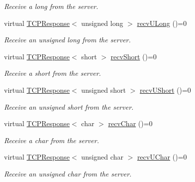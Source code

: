 \begin{DoxyCompactItemize}
\begin{DoxyCompactList}\small\item\em Receive a long from the server. \end{DoxyCompactList}\item 
virtual \hyperlink{class_rad_j_a_v_1_1_networking_1_1_t_c_p_response}{T\+C\+P\+Response}$<$ unsigned long $>$ \hyperlink{class_rad_j_a_v_1_1_networking_1_1_tcpip_client_af87bb449baef6ea793babd5b11cd28e7}{recv\+U\+Long} ()=0
\begin{DoxyCompactList}\small\item\em Receive an unsigned long from the server. \end{DoxyCompactList}\item 
virtual \hyperlink{class_rad_j_a_v_1_1_networking_1_1_t_c_p_response}{T\+C\+P\+Response}$<$ short $>$ \hyperlink{class_rad_j_a_v_1_1_networking_1_1_tcpip_client_a8dad9172da96083b5317d28522f47cba}{recv\+Short} ()=0
\begin{DoxyCompactList}\small\item\em Receive a short from the server. \end{DoxyCompactList}\item 
virtual \hyperlink{class_rad_j_a_v_1_1_networking_1_1_t_c_p_response}{T\+C\+P\+Response}$<$ unsigned short $>$ \hyperlink{class_rad_j_a_v_1_1_networking_1_1_tcpip_client_a85dd74424b331ea12115a2f85a9d2d5b}{recv\+U\+Short} ()=0
\begin{DoxyCompactList}\small\item\em Receive an unsigned short from the server. \end{DoxyCompactList}\item 
virtual \hyperlink{class_rad_j_a_v_1_1_networking_1_1_t_c_p_response}{T\+C\+P\+Response}$<$ char $>$ \hyperlink{class_rad_j_a_v_1_1_networking_1_1_tcpip_client_a831adf67f900d6bb5f57a38b800843b6}{recv\+Char} ()=0
\begin{DoxyCompactList}\small\item\em Receive a char from the server. \end{DoxyCompactList}\item 
virtual \hyperlink{class_rad_j_a_v_1_1_networking_1_1_t_c_p_response}{T\+C\+P\+Response}$<$ unsigned char $>$ \hyperlink{class_rad_j_a_v_1_1_networking_1_1_tcpip_client_aae09d9ff1d6c436b3a624bc94afce148}{recv\+U\+Char} ()=0
\begin{DoxyCompactList}\small\item\em Receive an unsigned char from the server. \end{DoxyCompactList}\item 

\end{DoxyCompactItemize}
